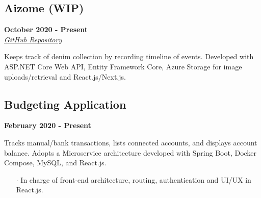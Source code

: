 \documentclass[10pt]{article}
\begin{document}
\begin{paracol}{2}
    \begin{leftcolumn} 
        \sloppy
        \subsection*{Aizome (WIP)}
        \textbf{October 2020 - Present} \\
        \textit{\href{https://github.com/dmtx97/Aizome}{\underline{GitHub Repository}}}
    \end{leftcolumn}
    \begin{rightcolumn} 
        \vspace{.2cm}
        \begin{flushleft} 
            Keeps track of denim collection by recording timeline of events. Developed with ASP.NET Core Web API, Entity Framework Core, Azure Storage for image uploads/retrieval and React.js/Next.js.        \end{flushleft}
        \vspace{-.6cm}
    \end{rightcolumn}    
\end{paracol}




\begin{paracol}{2}
    \begin{leftcolumn} 
        \sloppy
        \subsection*{Budgeting Application}
        \textbf{February 2020 - Present}
    \end{leftcolumn}
    \begin{rightcolumn} 
        \vspace{.2cm}
        \begin{flushleft} 
            Tracks manual/bank transactions, lists connected accounts, and displays account balance. Adopts a Microservice architecture developed with Spring Boot, Docker Compose, MySQL, and React.js.
        \end{flushleft}
        \vspace{-.6cm}
        \begin{itemize}[leftmargin=.28cm, itemsep=1pt]
            \item[$\cdot$]  In charge of front-end architecture, routing, authentication and UI/UX in React.js.
        \end{itemize}
    \end{rightcolumn}    
\end{paracol}
\end{document}
